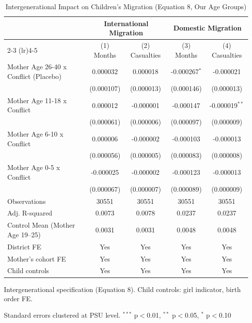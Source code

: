 \begin{table}[htbp]
\centering
\footnotesize
\caption{Intergenerational Impact on Children's Migration (Equation 8, Our Age Groups)}
\label{tab:eq8_agegroups}
\begin{tabular}{l cccc}
\toprule
 & \multicolumn{2}{c}{International Migration} & \multicolumn{2}{c}{Domestic Migration} \\
\cmidrule(lr){2-3} \cmidrule(lr){4-5}
 & (1) Months & (2) Casualties & (3) Months & (4) Casualties \\
\midrule
\quad Mother Age 26-40 x Conflict (Placebo) & 0.000032 & 0.000018 & -0.000267$^{*}$ & -0.000021 \\
 & (0.000107) & (0.000013) & (0.000146) & (0.000013) \\
\quad Mother Age 11-18 x Conflict & 0.000012 & -0.000001 & -0.000147 & -0.000019$^{**}$ \\
 & (0.000061) & (0.000006) & (0.000097) & (0.000009) \\
\quad Mother Age 6-10 x Conflict & 0.000006 & -0.000002 & -0.000103 & -0.000013 \\
 & (0.000056) & (0.000005) & (0.000083) & (0.000008) \\
\quad Mother Age 0-5 x Conflict & -0.000025 & -0.000002 & -0.000123 & -0.000013 \\
 & (0.000067) & (0.000007) & (0.000089) & (0.000009) \\
\midrule
Observations & 30551 & 30551 & 30551 & 30551 \\
Adj. R-squared & 0.0073 & 0.0078 & 0.0237 & 0.0237 \\
Control Mean (Mother Age 19--25) & 0.0031 & 0.0031 & 0.0048 & 0.0048 \\
District FE & Yes & Yes & Yes & Yes \\
Mother's cohort FE & Yes & Yes & Yes & Yes \\
Child controls & Yes & Yes & Yes & Yes \\
\bottomrule
\end{tabular}
\begin{tablenotes}
\footnotesize
\item Intergenerational specification (Equation 8). Child controls: girl indicator, birth order FE.
\item Standard errors clustered at PSU level. $^{***}$ p$<$0.01, $^{**}$ p$<$0.05, $^{*}$ p$<$0.10
\end{tablenotes}
\end{table}